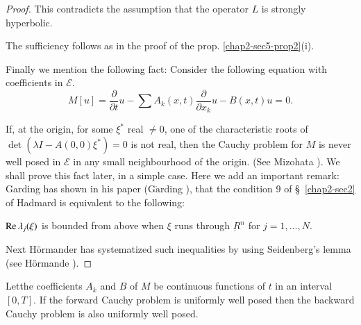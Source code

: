 \begin{proof}
This contradicts the assumption that the operator $L$ is strongly
hyperbolic. 
 
The sufficiency follows as in the proof of the prop. \ref{chap2-sec5-prop2}(i).
 
Finally we mention the following fact: Consider the following equation
with coefficients in $\mathscr{E}$. 
$$
M[u]= \frac{\partial}{\partial t} u- \sum A_k (x,  t)
\frac{\partial}{\partial x_k} u - B(x, t)u = 0. 
$$

If, at the origin, for some $\xi^*$ real $\neq 0$,  one of the
characteristic roots of $\det(\lambda I - A (0, 0) \xi^*) = 0$ is not
real,  then the Cauchy problem for $M$ is never well posed in
$\mathscr{E}$ in any small neighbourhood of the origin. (See Mizohata
\cite{key3}). We shall prove this fact later, in a simple case. Here we add
an important remark: Garding has shown in his paper
(G$\ring{\text{a}}$rding \cite{key1}), 
that the condition 9 of \S\ \ref{chap2-sec2} of Hadmard is equivalent
to the following: 
 
$\operatorname{Re} \lambda_j (\xi)$ is bounded from above when $\xi$ runs through
$\underbar{R}^n$ for $j=1, \ldots , N$. 
 
 Next H\"ormander has systematized such inequalities by using
 Seidenberg's lemma (see H\"ormande \cite{key1}). 
\end{proof}

\begin{proposition}\label{chap2-sec5-prop4}%
Let\pageoriginale the coefficients $A_k$ and $B$ of $M$ be continuous
functions of 
$t$ in an interval $[0, T]$. If the forward Cauchy problem is
uniformly well posed then the backward Cauchy problem is also
uniformly well posed. 
\end{proposition} 

